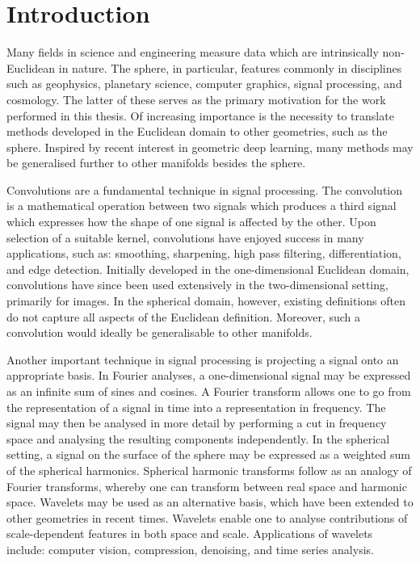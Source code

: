\chapter{Introduction}\label{sec:chapter1}

Many fields in science and engineering measure data which are intrinsically non-Euclidean in nature.
The sphere, in particular, features commonly in disciplines such as geophysics, planetary science, computer graphics, signal processing, and cosmology.
The latter of these serves as the primary motivation for the work performed in this thesis.
Of increasing importance is the necessity to translate methods developed in the Euclidean domain to other geometries, such as the sphere.
Inspired by recent interest in geometric deep learning, many methods may be generalised further to other manifolds besides the sphere.

Convolutions are a fundamental technique in signal processing.
The convolution is a mathematical operation between two signals which produces a third signal which expresses how the shape of one signal is affected by the other.
Upon selection of a suitable kernel, convolutions have enjoyed success in many applications, such as: smoothing, sharpening, high pass filtering, differentiation, and edge detection.
Initially developed in the one-dimensional Euclidean domain, convolutions have since been used extensively in the two-dimensional setting, primarily for images.
In the spherical domain, however, existing definitions often do not capture all aspects of the Euclidean definition.
Moreover, such a convolution would ideally be generalisable to other manifolds.

Another important technique in signal processing is projecting a signal onto an appropriate basis.
In Fourier analyses, a one-dimensional signal may be expressed as an infinite sum of sines and cosines.
A Fourier transform allows one to go from the representation of a signal in time into a representation in frequency.
The signal may then be analysed in more detail by performing a cut in frequency space and analysing the resulting components independently.
In the spherical setting, a signal on the surface of the sphere may be expressed as a weighted sum of the spherical harmonics.
Spherical harmonic transforms follow as an analogy of Fourier transforms, whereby one can transform between real space and harmonic space.
Wavelets may be used as an alternative basis, which have been extended to other geometries in recent times.
Wavelets enable one to analyse contributions of scale-dependent features in both space and scale.
Applications of wavelets include: computer vision, compression, denoising, and time series analysis.

